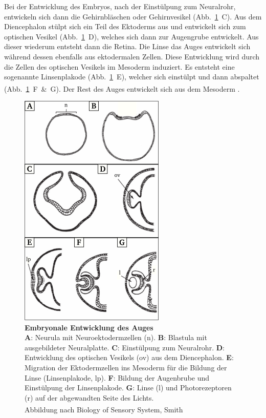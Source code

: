 \documentclass[12pt,a4paper,pdftex]{article}
\begin{document}
Bei der Entwicklung des Embryos, nach der Einstülpung zum Neuralrohr, entwickeln sich dann die Gehirnbläschen oder Gehirnvesikel (Abb.~\ref{fig:eye_neurulation}~C). Aus dem Diencephalon stülpt sich ein Teil des Ektoderms aus und entwickelt sich zum optischen Vesikel (Abb.~\ref{fig:eye_neurulation}~D), welches sich dann zur Augengrube  entwickelt. Aus dieser wiederum entsteht dann die Retina. Die Linse das Auges entwickelt sich während dessen ebenfalls aus ektodermalen Zellen. Diese Entwicklung wird durch die Zellen des optischen Vesikels  im Mesoderm induziert. Es entsteht eine sogenannte Linsenplakode  (Abb.~\ref{fig:eye_neurulation}~E), welcher sich einstülpt und dann abspaltet (Abb.~\ref{fig:eye_neurulation}~F~\&~G). Der Rest des Auges entwickelt sich aus dem Mesoderm \textsuperscript{\cite[16]{smith2008biology}}.

\begin{figure}[H]
    \centering
    \includegraphics{pictures/visual/Eye_Neurulation.png}
    \caption[Embryonale Entwicklung des Auges]{\textbf{Embryonale Entwicklung des Auges}\\
    \textbf{A}: Neurula mit Neuroektodermzellen (n). \textbf{B}: Blastula mit ausgebildeter Neuralplatte. \textbf{C}: Einstülpung zum Neuralrohr. \textbf{D}: Entwicklung des optischen Vesikels (ov) aus dem Diencephalon. \textbf{E}: Migration der Ektodermzellen ins Mesoderm für die Bildung der Linse (Linsenplakode, lp). \textbf{F}: Bildung der Augenbrube und Einstülpung der Linsenplakode. \textbf{G}: Linse (l) und Photorezeptoren (r) auf der abgewandten Seite des Lichts.\\
    Abbildung nach Biology of Sensory System, Smith \textsuperscript{\cite[16]{smith2008biology}}}
    \label{fig:eye_neurulation}
\end{figure}
\end{document}
